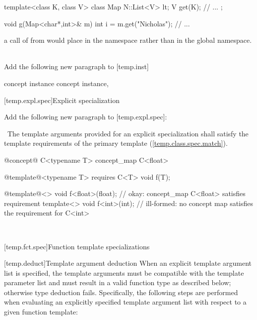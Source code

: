 \documentclass[american]{book}
\newcommand{\editorial}[1]{\colorbox{editbackground}{\begin{minipage}{\linewidth
}#1\end{minipage}}}
\begin{document}
\begin{paras}
\begin{codeblock}
template<class K, class V> class Map {
  N::List<V> lt;
  V get(K);
  // ...
};

void g(Map<char*,int>& m)
{
  int i = m.get("Nicholas");
  // ...
}
\end{codeblock}

a call of
from
would place
in the namespace
rather than in the global namespace.
\exitexample\ 

\noindent\editorial{Add the following new paragraph to [temp.inst]}
\setcounter{Paras}{14}
\pnum
{}
concept instance
concept instance, 

[temp.expl.spec]{Explicit specialization}

\noindent\editorial{Add the following new paragraph to [temp.expl.spec]:}

\setcounter{Paras}{22}
\color{addclr}
\pnum
\enternote\ The template arguments provided for an explicit specialization shall
satisfy the template requirements of the primary
template (\ref{temp.class.spec.match}). \exitnote\ \enterexample\
\begin{codeblock}
@\textcolor{addclr}{concept}@ C<typename T> { }
concept_map C<float> { }

@\textcolor{addclr}{template}@<typename T> requires C<T> void f(T);

@\textcolor{addclr}{template}@<> void f<float>(float); // okay: concept_map C<float> satisfies requirement
template<> void f<int>(int); // ill-formed: no concept map satisfies the requirement for C<int>
\end{codeblock}
\exitexample\
\color{black}

[temp.fct.spec]{Function template specializations}

\setcounter{subsection}{1}
[temp.deduct]{Template argument deduction}
\setcounter{Paras}{1}
\pnum
When an explicit template argument list is specified, the template
arguments must be compatible with the template parameter list and must
result in a valid function type as described below; otherwise type
deduction fails.  Specifically, the following steps are performed when
evaluating an explicitly specified template argument list with respect
to a given function template:


\end{paras}
\end{document}
